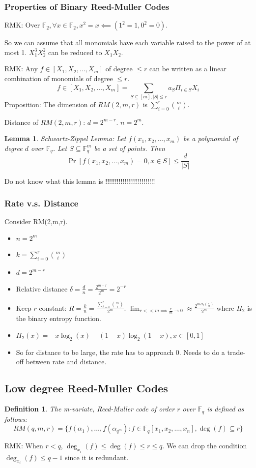 \documentclass[letterpaper,12pt]{article}
\newtheorem{definition}{Definition}
\newtheorem{lemma}{Lemma}
\begin{document}
\subsubsection{Properties of Binary Reed-Muller Codes}

RMK: Over $\mathbb{F}_2, \forall x \in \mathbb{F}_2, x^2=x \impliedby (1^2 = 1, 0^2 = 0)$.

So we can assume that all monomials have each variable raised to the power of at most 1. $X_1^3X_2^2$ can be reduced to $X_1X_2$.

RMK: Any $f\in[X_1,X_2,\ldots,X_m]$ of degree $\le r$ can be written as a linear combination of monomials of degree $\le r$.\[
    f\in[X_1,X_2,\ldots,X_m]=\sum_{S\subseteq [m],|S|\le r}a_S \Pi_{i\in S}X_i
\]
Proposition: The dimension of $RM(2,m,r)$ is $\sum_{i=0}^{r}\binom{m}{i}$.

Distance of $RM(2,m,r)$: $d=2^{m-r}$. $n=2^m$.
\begin{lemma}
    Schwartz-Zippel Lemma: Let $f(x_1,x_2,\ldots,x_m)$ be a polynomial of degree $d$ over $\mathbb{F}_q$. Let $S\subseteq \mathbb{F}_q^m$ be a set of points. Then \[
        \Pr[f(x_1,x_2,\ldots,x_m)=0, x\in S]\le \frac{d}{|S|}
    \]
\end{lemma}


Do not know what this lemma is !!!!!!!!!!!!!!!!!!!!!!!!!!
\subsubsection{Rate v.s. Distance}
Consider RM(2,m,r). \begin{itemize}
    \item $n=2^m$
    \item $k=\sum_{i=0}^{r}\binom{m}{i}$
    \item $d=2^{m-r}$
    \item Relative distance $\delta = \frac{d}{n} = \frac{2^{m-r}}{2^m} = 2^{-r}$
    \item Keep $r$ constant: $R=\frac{k}{n} = \frac{\sum_{i=0}^{r}\binom{m}{i}}{2^m}$. $\lim_{r << m \implies \frac{r}{m}\to 0} \approx \frac{2^{mH_2 (\frac{r}{m})}}{2^m}$ where $H_2$ is the binary entropy function.
    \item $H_2(x) = -x\log_2(x)-(1-x)\log_2(1-x), x\in[0,1]$
    \item So for distance to be large, the rate has to approach 0. Needs to do a trade-off between rate and distance.
\end{itemize}
\subsection{Low degree Reed-Muller Codes}
\begin{definition}
    The m-variate, Reed-Muller code of order $r$ over $\mathbb{F}_q$ is defined as follows: \[
        RM(q,m,r)= \{f(\alpha_1),\ldots, f(\alpha_{q^m}): f\in\mathbb{F}_q[x_1,x_2,\ldots,x_n],\deg (f)\subseteq r \}
    \]
\end{definition}
RMK: When $r<q$, $\deg_{x_i}(f)\le \deg(f)\le r\le q$. We can drop the condition $\deg_{x_i}(f)\le q-1$ since it is redundant. 
\end{document}
